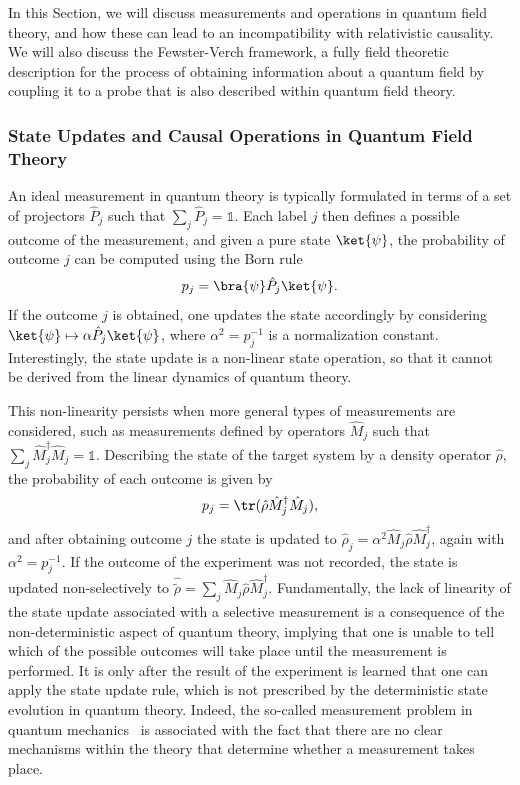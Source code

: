 \documentclass[letterpaper,12pt,titlepage,oneside,final]{book}
\newcommand{\openone}{\mathds{1}}
\begin{document}
In this Section, we will discuss measurements and operations in quantum field theory, and how these can lead to an incompatibility with relativistic causality. We will also discuss the Fewster-Verch framework, a fully field theoretic description for the process of obtaining information about a quantum field by coupling it to a probe that is also described within quantum field theory.

\subsubsection*{State Updates and Causal Operations in Quantum Field Theory}

An ideal measurement in quantum theory is typically formulated in terms of a set of projectors $\hat{P}_j$ such that $\sum_j \hat{P}_j = \openone$. Each label $j$ then defines a possible outcome of the measurement, and given a pure state $\ket{\psi}$, the probability of outcome $j$ can be computed using the Born rule
\begin{equation}
    p_j = \bra{\psi}\hat{P}_j\ket{\psi}.
\end{equation}
If the outcome $j$ is obtained, one updates the state accordingly by considering $\ket{\psi}\mapsto \alpha \hat{P}_j\ket{\psi}$, where $\alpha^2 = p_j^{-1}$ is a normalization constant. Interestingly, the state update is a non-linear state operation, so that it cannot be derived from the linear dynamics of quantum theory.

This non-linearity persists when more general types of measurements are considered, such as measurements defined by operators $\hat{M}_j$ such that $\sum_j \hat{M}_j^\dagger \hat{M}_j = \openone$. Describing the state of the target system by a density operator $\hat{\rho}$, the probability of each outcome is given by
\begin{equation}
    p_j = \tr(\hat{\rho}\hat{M}_j^\dagger\hat{M}_j),
\end{equation}
and after obtaining outcome $j$ the state is updated to $\hat{\rho}_j = \alpha^2\hat{M}_j\hat{\rho}\hat{M}_j^\dagger$, again with $\alpha^2 = p_j^{-1}$. If the outcome of the experiment was not recorded, the state is updated non-selectively to $\hat{\tilde{\rho}} = \sum_j \hat{M}_j \hat{\rho}\hat{M}_j^\dagger$. Fundamentally, the lack of linearity of the state update associated with a selective measurement is a consequence of the non-deterministic aspect of quantum theory, implying that one is unable to tell which of the possible outcomes will take place until the measurement is performed. It is only after the result of the experiment is learned that one can apply the state update rule, which is not prescribed by the deterministic state evolution in quantum theory. Indeed, the so-called measurement problem in quantum mechanics~\cite{MeasBallentine,MeasZurek,MeasSchlosshauer,MeasGao} is associated with the fact that there are no clear mechanisms within the theory that determine whether a measurement takes place.
\end{document}

